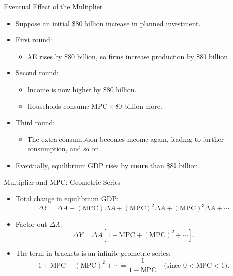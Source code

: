 \documentclass[aspectratio=169]{beamer}
\begin{document}
\begin{frame}{Eventual Effect of the Multiplier}
\transfade
\begin{itemize}
  \item Suppose an initial \$80 billion increase in planned investment.
  \item First round:
  \begin{itemize}
    \item AE rises by \$80 billion, so firms increase production by \$80 billion.
  \end{itemize}
  \item Second round:
  \begin{itemize}
    \item Income is now higher by \$80 billion.
    \item Households consume \(\text{MPC} \times 80\) billion more.
  \end{itemize}
  \item Third round:
  \begin{itemize}
    \item The extra consumption becomes income again, leading to further consumption, and so on.
  \end{itemize}
  \item Eventually, equilibrium GDP rises by \textbf{more} than \$80 billion.
\end{itemize}
\end{frame}

\begin{frame}{Multiplier and MPC: Geometric Series}
\transfade
\begin{itemize}
  \item Total change in equilibrium GDP:
  \[
    \Delta Y = \Delta A
      + (\text{MPC}) \Delta A
      + (\text{MPC})^2 \Delta A
      + (\text{MPC})^3 \Delta A
      + \cdots
  \]
  \item Factor out \(\Delta A\):
  \[
    \Delta Y = \Delta A \left[ 1 + \text{MPC}
      + (\text{MPC})^2 + \cdots \right].
  \]
  \item The term in brackets is an infinite geometric series:
  \[
    1 + \text{MPC} + (\text{MPC})^2 + \cdots
    = \frac{1}{1 - \text{MPC}}
    \quad \text{(since } 0 < \text{MPC} < 1\text{)}.
  \]
\end{itemize}
\end{frame}
\end{document}
